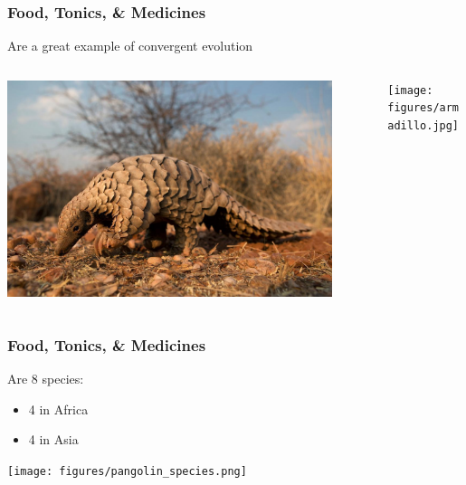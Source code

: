 \documentclass[10pt]{beamer}
\begin{document}
\begin{frame}[t]
\frametitle{Food, Tonics, \& Medicines}
\vspace{0.5cm}
	
	Are a great example of convergent evolution\\
	
	\vspace{0.5cm}
	
	\begin{columns}
		\begin{column}{0.5\textwidth}
			\begin{center}
				\includegraphics[width=0.9\textwidth]{figures/pangolin.jpg}
			\end{center}
		\end{column}
		
		\begin{column}{0.5\textwidth}
			\begin{center}
				\texttt{[image: figures/armadillo.jpg]}
			\end{center}
		\end{column}		
	\end{columns}
\end{frame}


\begin{frame}[t]
\frametitle{Food, Tonics, \& Medicines}
\vspace{0.25cm}
	
	Are 8 species:
		\smallskip
		\begin{itemize}
			\item 4 in Africa
			\smallskip
			\item 4 in Asia
		\end{itemize}
	
	\vspace{0.25cm}
	
	\begin{center}
		\texttt{[image: figures/pangolin\_species.png]}
	\end{center}
\end{frame}
\end{document}
